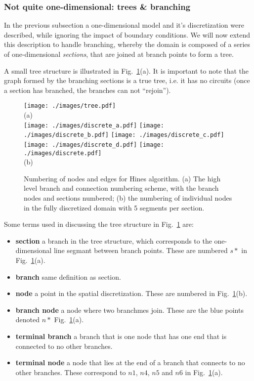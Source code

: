 \documentclass[11pt,a4paper]{article}
\newcommand{\fig}[1]{Fig.~\ref{#1}} %
\begin{document}
\subsubsection{Not quite one-dimensional: trees \& branching}
In the previous subsection a one-dimensional model and it's discretization were described, while ignoring the impact of boundary conditions. We will now extend this description to handle branching, whereby the domain is composed of a series of one-dimensional \emph{sections}, that are joined at branch points to form a tree.

A small tree structure is illustrated in \fig{fig:tree}(a). It is important to note that the graph formed by the branching sections is a true tree, i.e. it has no circuits (once a section has branched, the branches can not ``rejoin'').

\begin{figure}[htp!]
\centering
\texttt{[image: ./images/tree.pdf]}
\\{\normalsize (a)}\\
\texttt{[image: ./images/discrete\_a.pdf]}
\texttt{[image: ./images/discrete\_b.pdf]}
\texttt{[image: ./images/discrete\_c.pdf]}
\texttt{[image: ./images/discrete\_d.pdf]}
\texttt{[image: ./images/discrete.pdf]}
\\{\normalsize (b)}
\caption{Numbering of nodes and edges for Hines algorithm. (a) The high level branch and connection numbering scheme, with the branch nodes and sections numbered; (b) the numbering of individual nodes in the fully discretized domain with 5 segments per section.}
\label{fig:tree}
\end{figure}

Some terms used in discussing the tree structure in \fig{fig:tree} are:
\begin{itemize}
        \item \textbf{section} a branch in the tree structure, which corresponds to the one-dimensional line segmant between branch points. These are numbered $s*$ in \fig{fig:tree}(a).
        \item \textbf{branch} same definition as section.
        \item \textbf{node} a point in the spatial discretization. These are numbered in \fig{fig:tree}(b).
        \item \textbf{branch node} a node where two branchmes join. These are the blue points denoted $n*$ \fig{fig:tree}(a).
        \item \textbf{terminal branch} a branch that is one node that has one end that is connected to no other branches.
        \item \textbf{terminal node} a node that lies at the end of a branch that connects to no other branches. These correspond to $n1$, $n4$, $n5$ and $n6$ in \fig{fig:tree}(a).
\end{itemize}
\end{document}
